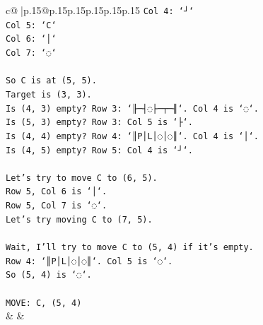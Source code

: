 \documentclass{article}
\begin{document}
{\begin{supertabular}{c@{$\;$}|p{.15\linewidth}@{}p{.15\linewidth}p{.15\linewidth}p{.15\linewidth}p{.15\linewidth}p{.15\linewidth}}
{{{\texttt{Col 4: `┘`} \\
\texttt{Col 5: `C`} \\
\texttt{Col 6: `│`} \\
\texttt{Col 7: `◌`} \\
\\ 
\texttt{So C is at (5, 5).} \\
\texttt{Target is (3, 3).} \\
\texttt{Is (4, 3) empty? Row 3: `╟─┤◌├─┬─╢`. Col 4 is `◌`.} \\
\texttt{Is (5, 3) empty? Row 3: Col 5 is `├`.} \\
\texttt{Is (4, 4) empty? Row 4: `║P│L│◌│◌║`. Col 4 is `│`.} \\
\texttt{Is (4, 5) empty? Row 5: Col 4 is `┘`.} \\
\\ 
\texttt{Let's try to move C to (6, 5).} \\
\texttt{Row 5, Col 6 is `│`.} \\
\texttt{Row 5, Col 7 is `◌`.} \\
\texttt{Let's try moving C to (7, 5).} \\
\\ 
\texttt{Wait, I'll try to move C to (5, 4) if it's empty.} \\
\texttt{Row 4: `║P│L│◌│◌║`. Col 5 is `◌`.} \\
\texttt{So (5, 4) is `◌`.} \\
\\ 
\texttt{MOVE: C, (5, 4)} \\
            }
        }
    }
    & & \\ \\


\end{supertabular}}
\end{document}
